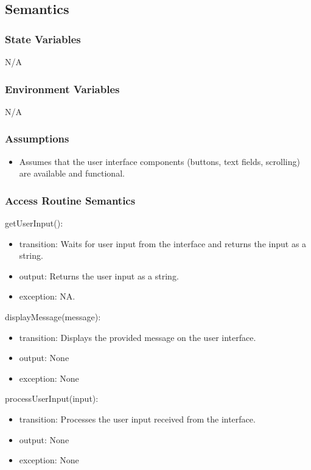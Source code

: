 \documentclass[12pt, titlepage]{article}
\begin{document}
\subsection{Semantics}

\subsubsection{State Variables}
N/A

\subsubsection{Environment Variables}
N/A

\subsubsection{Assumptions}
\begin{itemize}
\item Assumes that the user interface components (buttons, text fields, scrolling) are available and functional.
\end{itemize}


\subsubsection{Access Routine Semantics}

\noindent getUserInput():
\begin{itemize}
\item transition: Waits for user input from the interface and returns the input as a string.
\item output: Returns the user input as a string.
\item exception: NA.
\end{itemize}

\noindent displayMessage(message):
\begin{itemize}
\item transition: Displays the provided message on the user interface.
\item output:  None
\item exception:  None
\end{itemize}

\noindent processUserInput(input):
\begin{itemize}
\item transition: Processes the user input received from the interface.
\item output:  None
\item exception:  None
\end{itemize}
\end{document}
